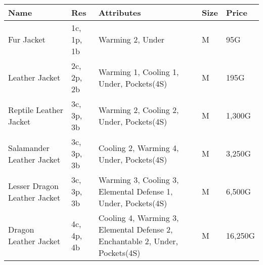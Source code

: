 \begin{longtable}{p{3.5cm} | p{1.5cm} | p{5cm} | p{1cm} | p{1.25cm}}
	Name & Res &  Attributes & Size & Price\\ \hline
	Fur Jacket & 1c, 1p, 1b & Warming 2, Under & M & 95G\\

	Leather Jacket & 2c, 2p, 2b & Warming 1, Cooling 1, Under, Pockets(4S)  & M & 195G\\

	Reptile Leather Jacket & 3c, 3p, 3b & Warming 2, Cooling 2, Under, Pockets(4S) & M & 1,300G\\

	Salamander Leather Jacket & 3c, 3p, 3b & Cooling 2, Warming 4, Under, Pockets(4S) & M & 3,250G\\

	Lesser Dragon Leather Jacket & 3c, 3p, 3b & Warming 3, Cooling 3, Elemental Defense 1, Under, Pockets(4S) & M & 6,500G\\

	Dragon Leather Jacket & 4c, 4p, 4b & Cooling 4, Warming 3, Elemental Defense 2, Enchantable 2, Under, Pockets(4S) & M & 16,250G\\
\end{longtable}

